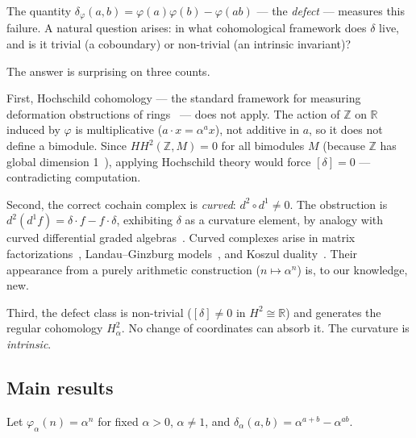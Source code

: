 \documentclass[11pt,a4paper]{article}
\theoremstyle{plain}
\theoremstyle{definition}
\theoremstyle{remark}
\newcommand{\ZZ}{\mathbb{Z}}
\newcommand{\RR}{\mathbb{R}}
\begin{document}
The quantity $\delta_\varphi(a,b) = \varphi(a)\varphi(b) - \varphi(ab)$ 
--- the \textit{defect} --- measures this failure. A natural question 
arises: in what cohomological framework does $\delta$ live, and is it 
trivial (a coboundary) or non-trivial (an intrinsic invariant)?

The answer is surprising on three counts.

First, Hochschild cohomology --- the standard framework for measuring 
deformation obstructions of rings~\cite{Gerstenhaber1964, Hochschild1945} 
--- does not apply. The action of $\ZZ$ on $\RR$ induced by $\varphi$ 
is multiplicative ($a \cdot x = \alpha^a x$), not additive in $a$, 
so it does not define a bimodule. Since $HH^2(\ZZ, M) = 0$ for all 
bimodules $M$ (because $\ZZ$ has global dimension 1~\cite{Weibel1994}), 
applying Hochschild theory would force $[\delta] = 0$ --- contradicting 
computation.

Second, the correct cochain complex is \textit{curved}: $d^2 \circ 
d^1 \neq 0$. The obstruction is $d^2(d^1 f) = \delta \cdot f - f 
\cdot \delta$, exhibiting $\delta$ as a curvature element, by analogy with 
curved differential graded algebras~\cite{Positselski2011, 
KellerLowenNicolas2009}. Curved complexes arise in matrix 
factorizations~\cite{Eisenbud1980}, Landau--Ginzburg 
models~\cite{Orlov2004}, and Koszul duality~\cite{Positselski2011}. 
Their appearance from a purely arithmetic construction ($n \mapsto 
\alpha^n$) is, to our knowledge, new.

Third, the defect class is non-trivial ($[\delta] \neq 0$ in $H^2 
\cong \RR$) and generates the regular cohomology $H^2_\alpha$. No change of
coordinates can absorb it. The curvature is \textit{intrinsic}.

\subsection{Main results}

Let $\varphi_\alpha(n) = \alpha^n$ for fixed $\alpha > 0$, $\alpha 
\neq 1$, and $\delta_\alpha(a,b) = \alpha^{a+b} - \alpha^{ab}$.
\end{document}
